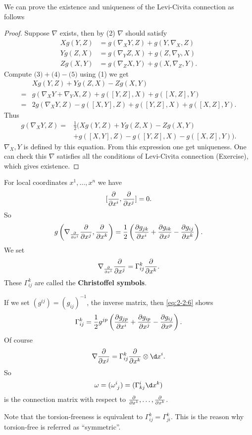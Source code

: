 \documentclass[12pt]{article}
\begin{document}
We can prove the existence and uniqueness of the Levi-Civita connection as follows
\begin{proof}
    Suppose \(\nabla\) exists, then by (2) \(\nabla\) should satisfy
    \begin{align}
        Xg(Y,Z)&=g(\nabla_X Y,Z)+g(Y,\nabla_X,Z) \tag{3} \\
        Yg(Z,X)&=g(\nabla_Y Z,X)+g(Z,\nabla_Y,X) \tag{4} \\
        Zg(X,Y)&=g(\nabla_Z X,Y)+g(X,\nabla_Z,Y) \tag{5}
    .\end{align}
    Compute \(\text{(3)}+\text{(4)}-\text{(5)}\) using (1) we get
    \begin{align*}
        &Xg(Y,Z)+Yg(Z,X)-Zg(X,Y) \\
        =&g(\nabla_X Y+\nabla_Y X,Z)+g([Y,Z],X)+g([X,Z],Y) \\
        =&2g(\nabla_X Y,Z)-g([X,Y],Z)+g([Y,Z],X)+g([X,Z],Y)
    .\end{align*}
    Thus 
    \begin{align*}
        g(\nabla_X Y,Z)=&\frac{1}{2}\big(Xg(Y,Z)+Yg(Z,X)-Zg(X,Y) \\
        &+g([X,Y],Z)-g([Y,Z],X)-g([X,Z],Y)\big)
    .\end{align*}
    \(\nabla_X,Y\) is defined by this equation. From this expression one get
    uniqueness. One can check this \(\nabla\) satisfies all the conditions of
    Levi-Civita connection (Exercise), which gives existence.
\end{proof}

For local coordinates \(x^1,\ldots,x^n\) we have \[
    [\pdv{}{x^i},\pdv{}{x^j}]=0
.\] So
\begin{equation}\label{eq:2-2:6}
    g\left(\nabla_{\pdv{}{x^i}}\pdv{}{x^j},\pdv{}{x^k}\right)
    =\frac{1}{2}\left(\pdv{g_{jk}}{x^i}+\pdv{g_{ik}}{x^j}-\pdv{g_{ij}}{x^k}\right)
.\end{equation}
We set \[
    \nabla_{\pdv{}{x^i}}\pdv{}{x^j}=\Gamma_{ij}^k\pdv{}{x^k}
.\] These \(\Gamma_{ij}^k\) are called the \textbf{Christoffel symbols}.

If we set \((g^{ij})=(g_{ij})^{-1}\), the inverse matrix, then \cref{eq:2-2:6} shows \[
    \Gamma_{ij}^k=\frac{1}{2}g^{jp}\left(\pdv{g_{jp}}{x^i}+\pdv{g_{ip}}{x^j}
    -\pdv{g_{ij}}{x^p}\right)
.\] Of course \[
    \nabla\pd{x^j}=\Gamma_{ij}^k\pd{x^k}\otimes \dd{x^i}
.\] So \[
    \omega=(\tensor{\omega}{^i_j})=(\Gamma_{kj}^i\dd{x^k})
\] is the connection matrix with respect to \(\pdv{}{x^1},\ldots,\pdv{}{x^k}\).

Note that the torsion-freeness is equivalent to \(\Gamma_{ij}^k=\Gamma_{ji}^k\). This
is the reason why torsion-free is referred as ``symmetric''.
\end{document}
